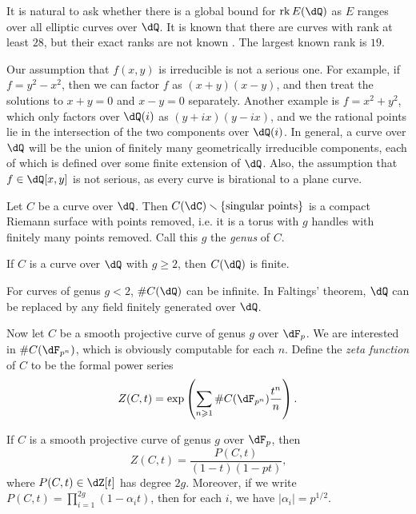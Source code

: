 \documentclass{article}
\begin{document}
It is natural to ask whether there is a global bound for $\rank E(\dQ)$ as 
$E$ ranges over all elliptic curves over $\dQ$. 
It is known that there are curves with rank at least $28$, but their exact 
ranks are not known \cite{du}. The largest known rank is $19$.  

Our assumption that $f(x,y)$ is irreducible is not a serious one. For example, 
if $f=y^2-x^2$, then we can factor $f$ as $(x+y)(x-y)$, and then treat the 
solutions to $x+y=0$ and $x-y=0$ separately. Another example is $f=x^2+y^2$, 
which only factors over $\dQ(i)$ as $(y+i x)(y-i x)$, and we the rational 
points lie in the intersection of the two components over $\dQ(i)$. In general, 
a curve over $\dQ$ will be the union of finitely many geometrically irreducible 
components, each of which is defined over some finite extension of $\dQ$. Also, 
the assumption that $f\in \dQ[x,y]$ is not serious, as every curve is 
birational to a plane curve. 

Let $C$ be a curve over $\dQ$. Then 
$C(\dC)\smallsetminus \{\text{singular points}\}$ is a compact Riemann 
surface with points removed, i.e. it is a torus with $g$ handles with finitely 
many points removed. Call this $g$ the \emph{genus} of $C$. 

\begin{theorem}
If $C$ is a curve over $\dQ$ with $g\geqslant 2$, then $C(\dQ)$ 
is finite. 
\end{theorem}

For curves of genus $g<2$, $\# C(\dQ)$ can be infinite. In Faltings' 
theorem, $\dQ$ can be replaced by any field finitely generated over 
$\dQ$. 

Now let $C$ be a smooth projective curve of genus $g$ over $\dF_p$. 
We are interested in $\#C(\dF_{p^n})$, which is obviously computable 
for each $n$. Define the \emph{zeta function} of $C$ to be the formal power 
series 
\[
  Z(C,t) = \exp\left( \sum_{n\geqslant 1} \# C(\dF_{p^n}) \frac{t^n}{n} \right) \text{.}
\]

\begin{theorem}[Weil]\label{thm:Weil-curve}
If $C$ is a smooth projective curve of genus $g$ over $\dF_p$, then 
\[
  Z(C,t) = \frac{P(C,t)}{(1-t)(1-p t)} \text{,}
\]
where $P(C,t)\in \dZ[t]$ has degree $2 g$. Moreover, if we write
$P(C,t) = \prod_{i=1}^{2 g} (1-\alpha_i t)$, then for each $i$, we have 
$|\alpha_i|=p^{1/2}$. 
\end{theorem}
\end{document}
